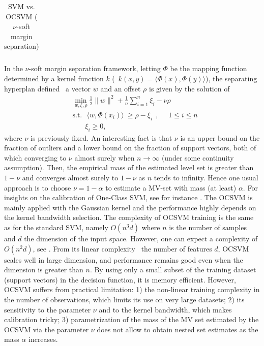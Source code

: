 \begin{table}[!ht]
\begin{tabular}{|c|c|}
              
  \end{tabular}
  \caption{SVM vs. OCSVM ($\nu$-soft margin separation)}
  \label{table:OCSVM-soft}
\end{table}

In the $\nu$-soft margin separation framework, letting $\Phi$ be the mapping function determined by a kernel function $k$ (\ie~$k(x,y) = \langle \Phi(x), \Phi(y)\rangle$), the separating hyperplan defined \wrt~a vector $w$ and an offset $\rho$ is given by the solution of 
\begin{align*}
&\min_{w,\xi,\rho} \frac{1}{2} \|w\|^2 + \frac{1}{n} \sum_{i=1}^n \xi_i - \nu \rho\\
&\text{s.t.}~~~ \langle w, \Phi(x_i)\rangle ~\ge \rho - \xi_i~~,~~~~~~1 \le i \le n \\
& ~~~~~~~~\xi_i \ge 0,
\end{align*}
where $\nu$ is previously fixed. An interesting fact is that $\nu$ is an upper bound on the fraction of outliers and a lower bound on the fraction of support vectors, both of which converging to $\nu$ almost surely when $n \to \infty$ (under some continuity assumption). Then, the empirical mass of the estimated level set is greater than $1-\nu$ and converges almost surely to $1-\nu$ as $n$ tends to infinity. Hence one usual approach is to choose $\nu = 1 - \alpha$ to estimate a MV-set with mass (at least) $\alpha$. For insights on the calibration of One-Class SVM, see for instance \cite{Thomas2015}.
%
The OCSVM is mainly applied with the Gaussian kernel and the performance highly depends on the kernel bandwidth selection.
The complexity of OCSVM training is the same as for the standard SVM, namely $O(n^3 d)$ where $n$ is the number of samples and $d$ the dimension of the input space. However, one can expect a complexity of $O(n^2 d)$, see \cite{Bottou2007}. From its linear complexity \wrt~the number of features $d$, OCSVM scales well in large dimension, and performance remains good even when the dimension is greater than $n$. By using only a small subset of the training dataset (support vectors) in the decision function, it is memory efficient. However, OCSVM suffers from practical limitation: 1) the non-linear training complexity in the number of observations, which limits its use on very large datasets; 2) its sensitivity to the parameter $\nu$ and to the kernel bandwidth, which makes calibration tricky; 3) parametrization of the mass of the MV set estimated by the OCSVM via the parameter $\nu$ does not allow to obtain nested set estimates as the mass $\alpha$ increases.

